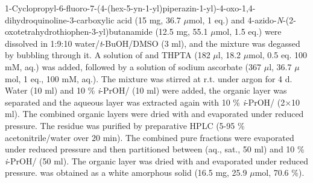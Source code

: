 1-Cyclopropyl-6-fluoro-7-(4-(hex-5-yn-1-yl)piperazin-1-yl)-4-oxo-1,4\hyp{}dihydro\-quinoline-3-carboxylic acid  (15 mg, 36.7 $\mu$mol, 1 eq.) and 
4\hyp{}azido\hyp{}\textit{N}\hyp{}(2\hyp{}oxotetrahydrothiophen\hyp{}3\hyp{}yl)butanamide  (12.5 mg, 55.1 $\mu$mol, 1.5 eq.) 
were dissolved in 1:9:10 water/\textit{t}-BuOH/DMSO (3 ml), and the mixture was degassed by bubbling  through it. 
A solution of  and THPTA (182 $\mu$l, 18.2 $\mu$mol, 0.5 eq. 100 mM, aq.) was added, followed by a solution of sodium ascorbate (367 $\mu$l, 36.7 $\mu$mol, 1 eq., 100 mM, aq.). 
The mixture was stirred at r.t. under argon for 4 d. Water (10 ml) and 10 \% \textit{i}-PrOH/ (10 ml) were added, the organic layer was separated and the aqueous layer was extracted again with 10 \% \textit{i}-PrOH/ (2$\times$10 ml). The combined organic layers were dried with  and evaporated under reduced pressure. The residue was purified by preparative HPLC (5-95 \% acetonitrile/water over 20 min). 
The combined pure fractions were evaporated under reduced pressure and then partitioned between  (aq., sat., 50 ml) and 10 \% \textit{i}-PrOH/ (50 ml). The organic layer was dried with  and evaporated under reduced pressure.
 was obtained as a white amorphous solid (16.5 mg, 25.9 $\mu$mol, 70.6 \%).
\\[1\baselineskip]
\\[1\baselineskip]
